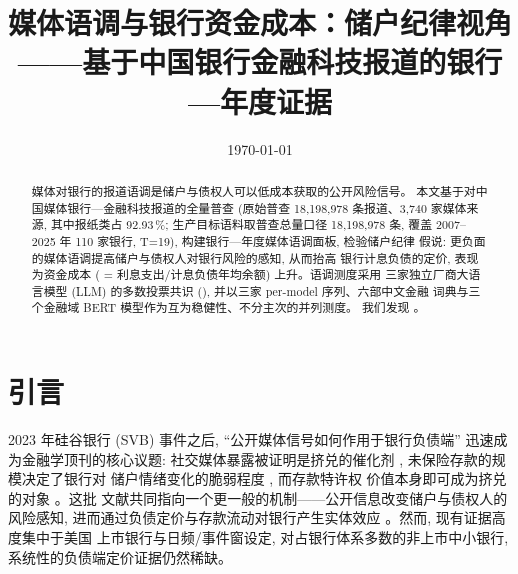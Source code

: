 




\title{媒体语调与银行资金成本：储户纪律视角\\
       {\large ——基于中国银行金融科技报道的银行—年度证据}}
\author{}
\date{\today}


\maketitle

\begin{abstract}
媒体对银行的报道语调是储户与债权人可以低成本获取的公开风险信号。
本文基于对中国媒体银行—金融科技报道的全量普查
(原始普查 18{,}198{,}978 条报道、3{,}740 家媒体来源, 其中报纸类占
92.93\,\%; 生产目标语料取普查总量口径 18{,}198{,}978 条, 覆盖
2007--2025 年 110 家银行, T=19), 构建银行—年度媒体语调面板, 检验储户纪律
假说: 更负面的媒体语调提高储户与债权人对银行风险的感知, 从而抬高
银行计息负债的定价, 表现为资金成本
( = 利息支出/计息负债年均余额) 上升。语调测度采用
三家独立厂商大语言模型 (LLM) 的多数投票共识
(), 并以三家 per-model 序列、六部中文金融
词典与三个金融域 BERT 模型作为互为稳健性、不分主次的并列测度。
我们发现 \@。
\end{abstract}

\section{引言}\label{sec:intro}

2023 年硅谷银行 (SVB) 事件之后, ``公开媒体信号如何作用于银行负债端''
迅速成为金融学顶刊的核心议题: 社交媒体暴露被证明是挤兑的催化剂
\parencite{cookson2026runcatalyst}, 未保险存款的规模决定了银行对
储户情绪变化的脆弱程度 \parencite{jiang2024fragility}, 而存款特许权
价值本身即可成为挤兑的对象 \parencite{drechsler2026franchise}。这批
文献共同指向一个更一般的机制——公开信息改变储户与债权人的风险感知,
进而通过负债定价与存款流动对银行产生实体效应
\parencite{goldstein2023information}。然而, 现有证据高度集中于美国
上市银行与日频/事件窗设定, 对占银行体系多数的非上市中小银行,
系统性的负债端定价证据仍然稀缺。

